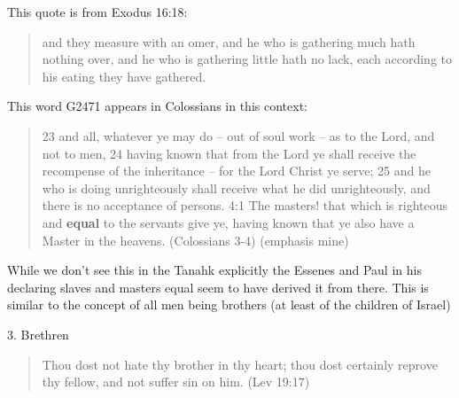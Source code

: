 \documentclass[11pt]{article}
\begin{document}
This quote is from Exodus 16:18:
\begin{quote}
and they measure with an omer, and he who is gathering much hath nothing over, and he who is gathering little hath no lack, each according to his eating they have gathered.
\end{quote}

This word G2471 appears in Colossians in this context:
\begin{quote}
23 and all, whatever ye may do -- out of soul work -- as to the Lord, and not to men,
24 having known that from the Lord ye shall receive the recompense of the inheritance -- for the Lord Christ ye serve;
25 and he who is doing unrighteously shall receive what he did unrighteously, and there is no acceptance of persons.
4:1 The masters! that which is righteous and \textbf{equal} to the servants give ye, having known that ye also have a Master in the heavens.
(Colossians 3-4) (emphasis mine)
\end{quote} 


While we don't see this in the Tanahk explicitly the Essenes and Paul in his declaring slaves and masters equal seem to have derived it from there. This is similar to the concept of all men being brothers (at least of the children of Israel) \newline

3. Brethren
\begin{quote}
Thou dost not hate thy brother in thy heart; thou dost certainly reprove thy fellow, and not suffer sin on him. (Lev 19:17)
\end{quote}
\end{document}
